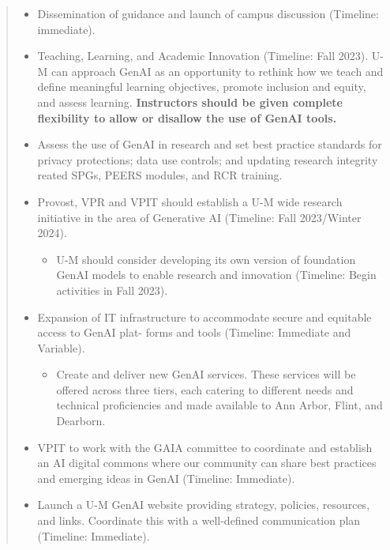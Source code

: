 \documentclass[
]{book}
\providecommand{\tightlist}{%
  \setlength{\itemsep}{0pt}\setlength{\parskip}{0pt}}
\begin{document}
\begin{quote}
\begin{itemize}
\item
  Dissemination of guidance and launch of campus discussion (Timeline: immediate).
\item
  Teaching, Learning, and Academic Innovation (Timeline: Fall 2023). U-M can approach GenAI as an opportunity to rethink how we teach and define meaningful learning objectives, promote inclusion and equity, and assess learning. \textbf{Instructors should be given complete flexibility to allow or disallow the use of GenAI tools.}
\item
  Assess the use of GenAI in research and set best practice standards for privacy protections; data use controls; and updating research integrity reated SPGs, PEERS modules, and RCR training.
\item
  Provost, VPR and VPIT should establish a U-M wide research initiative in the area of Generative AI (Timeline: Fall 2023/Winter 2024).

  \begin{itemize}
  \tightlist
  \item
    U-M should consider developing its own version of foundation GenAI models to enable research and innovation (Timeline: Begin activities in Fall 2023).
  \end{itemize}
\item
  Expansion of IT infrastructure to accommodate secure and equitable access to GenAI plat- forms and tools (Timeline: Immediate and Variable).

  \begin{itemize}
  \tightlist
  \item
    Create and deliver new GenAI services. These services will be offered across three tiers, each catering to different needs and technical proficiencies and made available to Ann Arbor, Flint, and Dearborn.
  \end{itemize}
\item
  VPIT to work with the GAIA committee to coordinate and establish an AI digital commons where our community can share best practices and emerging ideas in GenAI (Timeline: Immediate).
\item
  Launch a U-M GenAI website providing strategy, policies, resources, and links. Coordinate this with a well-defined communication plan (Timeline: Immediate).
\end{itemize}
\end{quote}
\end{document}
